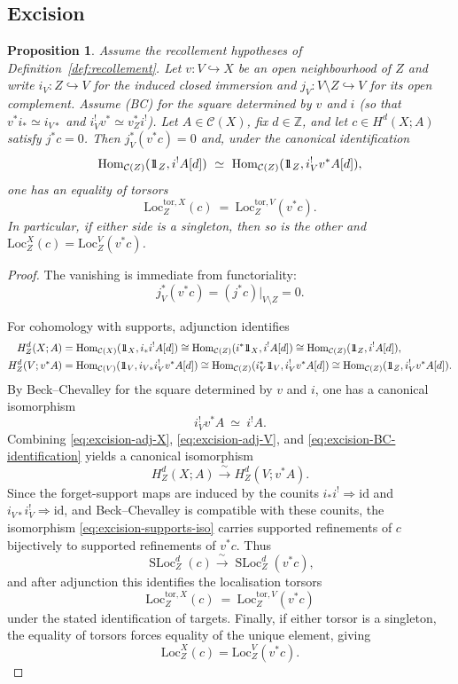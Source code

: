 \documentclass[10pt,a4paper,dvipsnames,x11names]{amsart}
\newcommand{\one}{1\hskip-3.5pt1}
\newcommand{\C}{\mathcal C}
\newcommand{\id}{\mathrm{id}}
\newcommand{\Hom}{\mathrm{Hom}}
\newcommand{\Loc}{\mathrm{Loc}}
\newcommand{\SLoc}{\operatorname{SLoc}}
\numberwithin{equation}{section}
\theoremstyle{plain}
\newtheorem{proposition}[proposition]{Proposition}
\theoremstyle{definition}
\theoremstyle{remark}
\begin{document}
\subsection{Excision}

\begin{proposition} \label{prop:Loc-excision}
Assume the recollement hypotheses of Definition~\ref{def:recollement}. Let $v:V\hookrightarrow X$ be an open neighbourhood of $Z$ and write
$i_V:Z\hookrightarrow V$ for the induced closed immersion and $j_V:V\setminus Z\hookrightarrow V$ for its open complement.
Assume (BC) for the square determined by $v$ and $i$ (so that $v^*i_*\simeq i_{V*}$ and $i_V^!v^*\simeq v_Z^*i^!$).
Let $A\in\C(X)$, fix $d\in\mathbb Z$, and let $c\in H^d(X;A)$ satisfy $j^*c=0$.
Then $j_V^*(v^*c)=0$ and, under the canonical identification
$$
\Hom_{\C(Z)}(\one_Z,i^!A[d])\ \simeq\ \Hom_{\C(Z)}(\one_Z,i_V^!v^*A[d]),
$$
one has an equality of torsors
$$
\Loc_Z^{\mathrm{tor},X}(c)\ =\ \Loc_Z^{\mathrm{tor},V}(v^*c).
$$
In particular, if either side is a singleton, then so is the other and $\Loc_Z^{X}(c)=\Loc_Z^{V}(v^*c)$.
\end{proposition}

\begin{proof}
The vanishing is immediate from functoriality:
$$
j_V^*(v^*c)= (j^*c)|_{V\setminus Z}=0.
$$

For cohomology with supports, adjunction identifies
\begin{align}
H_Z^d(X;A)
&=\Hom_{\C(X)}(\one_X,i_*i^!A[d])
\cong \Hom_{\C(Z)}(i^*\one_X,i^!A[d])
\cong \Hom_{\C(Z)}(\one_Z,i^!A[d]), \label{eq:excision-adj-X}\\
H_Z^d(V;v^*A)
&=\Hom_{\C(V)}(\one_V,i_{V*}i_V^!v^*A[d])
\cong \Hom_{\C(Z)}(i_V^*\one_V,i_V^!v^*A[d])
\cong \Hom_{\C(Z)}(\one_Z,i_V^!v^*A[d]). \label{eq:excision-adj-V}
\end{align}
By Beck--Chevalley for the square determined by $v$ and $i$, one has a canonical isomorphism
\begin{equation}\label{eq:excision-BC-identification}
i_V^!v^*A\ \simeq\ i^!A.
\end{equation}
Combining \eqref{eq:excision-adj-X}, \eqref{eq:excision-adj-V}, and \eqref{eq:excision-BC-identification} yields a canonical isomorphism
\begin{equation}\label{eq:excision-supports-iso}
H_Z^d(X;A)\xrightarrow{\ \sim\ } H_Z^d(V;v^*A).
\end{equation}
Since the forget-support maps are induced by the counits $i_*i^!\Rightarrow \id$ and $i_{V*}i_V^!\Rightarrow \id$, and Beck--Chevalley is compatible with these counits, the isomorphism \eqref{eq:excision-supports-iso} carries supported refinements of $c$ bijectively to supported refinements of $v^*c$. Thus
$$
\SLoc_Z^d(c)\xrightarrow{\ \sim\ }\SLoc_Z^d(v^*c),
$$
and after adjunction this identifies the localisation torsors
$$
\Loc_Z^{\mathrm{tor},X}(c)
\ =\
\Loc_Z^{\mathrm{tor},V}(v^*c)
$$
under the stated identification of targets.
Finally, if either torsor is a singleton, the equality of torsors forces equality of the unique element, giving
$$
\Loc_Z^{X}(c)=\Loc_Z^{V}(v^*c).
$$
\end{proof}
\end{document}
